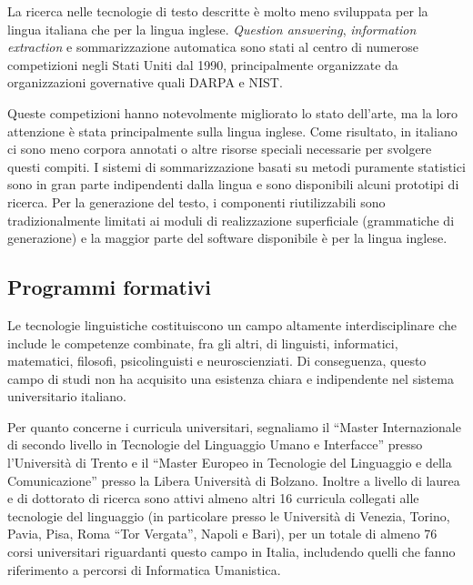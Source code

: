 \begin{multicols}{2}
La ricerca nelle tecnologie di testo descritte \`{e} molto meno sviluppata per la lingua italiana che per la lingua inglese. \emph{Question answering}, \emph{information extraction} e sommarizzazione automatica sono stati al centro di numerose competizioni negli Stati Uniti dal 1990, principalmente organizzate da organizzazioni governative quali DARPA e NIST. 


Queste competizioni hanno notevolmente migliorato lo stato dell'arte, ma la loro attenzione \`{e} stata principalmente sulla lingua inglese. Come risultato, in italiano ci sono meno corpora annotati o altre risorse speciali necessarie per svolgere questi compiti. I sistemi di sommarizzazione basati su  metodi puramente statistici sono in gran parte indipendenti dalla lingua e sono disponibili alcuni prototipi di ricerca. Per la generazione del testo, i componenti riutilizzabili sono tradizionalmente limitati ai moduli di realizzazione superficiale (grammatiche di generazione) e la maggior parte del software disponibile \`{e} per la lingua inglese.

\subsection{Programmi formativi}

Le tecnologie linguistiche costituiscono un campo altamente interdisciplinare che include le competenze combinate, fra gli altri, di linguisti, informatici, matematici, filosofi, psicolinguisti e neuroscienziati. Di conseguenza, questo campo di studi non ha acquisito una esistenza chiara e indipendente nel sistema universitario italiano.

Per quanto concerne i curricula universitari, segnaliamo il “Master Internazionale di secondo livello in Tecnologie del Linguaggio Umano e Interfacce” presso l'Universit\`{a} di Trento e il “Master Europeo in Tecnologie del Linguaggio e della Comunicazione” presso la Libera Universit\`{a} di Bolzano. Inoltre a livello di laurea e di dottorato di ricerca sono attivi almeno altri 16 curricula collegati alle tecnologie del linguaggio (in particolare presso le Universit\`{a} di Venezia, Torino, Pavia, Pisa, Roma “Tor Vergata”, Napoli e Bari), per un totale di almeno 76 corsi universitari riguardanti questo campo in Italia, includendo quelli che fanno riferimento a percorsi di Informatica Umanistica.


\end{multicols}
